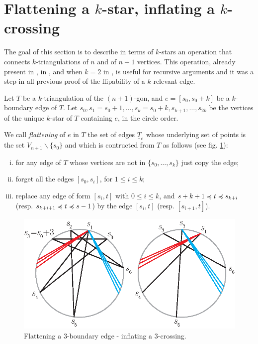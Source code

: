 \documentclass[12pt]{amsart}
\begin{document}


\section{Flattening a $k$-star, inflating a $k$-crossing}\label{sectionflatinflat}

The goal of this section is to describe in terms of $k$-stars an operation that connects $k$-triangulations of $n$ and of $n+1$ vertices. This operation, already present in \cite{j-gt-03}, in \cite{n-gdfcp-00}, and when $k=2$ in \cite{e-btdp-06}, is useful for recursive arguments and it was a step in all previous proof of the flipability of a $k$-relevant edge.


\medskip
Let $T$ be a $k$-triangulation of the $(n+1)$-gon, and $e=[s_0,s_0+k]$ be a $k$-boundary edge of $T$.
Let $s_0,s_1=s_0+1,\ldots,s_k=s_0+k,s_{k+1},\ldots,s_{2k}$ be the vertices of the unique $k$-star of $T$ containing $e$, in the circle order.

We call \emph{flattening} of $e$ in $T$ the set of edges $\underline{T}_e$ whose underlying set of points is the set $V_{n+1}\smallsetminus\{s_0\}$ and which is contructed from $T$ as follows (see fig. \ref{flatinfl}):
\begin{enumerate}[(i)]
\item for any edge of $T$ whose vertices are not in $\{s_0,\ldots,s_k\}$ just copy the edge;
\item forget all the edges $[s_0,s_i]$, for $1\le i\le k$;
\item replace any edge of form $[s_i,t]$ with $0\le i\le k$, and $s+k+1\preccurlyeq t \preccurlyeq s_{k+i}$ (resp. $s_{k+i+1}\preccurlyeq t\preccurlyeq s-1$) by the edge $[s_i,t]$ (resp. $[s_{i+1},t]$).
\end{enumerate}

\begin{figure}
\centerline{\includegraphics[scale=1]{flatinfl.eps}}
\caption{\small{Flattening a $3$-boundary edge - inflating a $3$-crossing.}}\label{flatinfl}
\end{figure}
\end{document}

